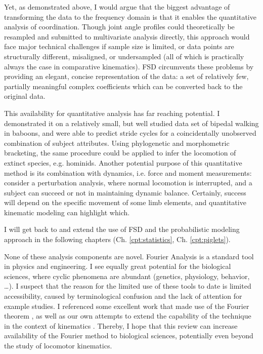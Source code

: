 Yet, as demonstrated above, I would argue that the biggest advantage of transforming the data to the frequency domain is that it enables the quantitative analysis of coordination.
Though joint angle profiles could theoretically be resampled and submitted to multivariate analysis directly, this approach would face major technical challenges if sample size is limited, or data points are structurally different, misaligned, or undersampled (all of which is practically always the case in comparative kinematics).
FSD circumvents these problems by providing an elegant, concise representation of the data: a set of relatively few, partially meaningful complex coefficients which can be converted back to the original data.


This availability for quantitative analysis has far reaching potential.
I demonstrated it on a relatively small, but well studied data set of bipedal walking in baboons, and were able to predict stride cycles for a coincidentally unobserved combination of subject attributes.
Using phylogenetic and morphometric bracketing, the same procedure could be applied to infer the locomotion of extinct species, e.g. hominids.
Another potential purpose of this quantitative method is its combination with dynamics, i.e. force and moment measurements:
consider a perturbation analysis, where normal locomotion is interrupted, and a subject can succeed or not in maintaining dynamic balance.
Certainly, success will depend on the specific movement of some limb elements, and quantitative kinematic modeling can highlight which.

I will get back to and extend the use of FSD and the probabilistic modeling approach in the following chapters (Ch. \ref{cpt:statistics}, Ch. \ref{cpt:piglets}).


None of these analysis components are novel.
Fourier Analysis is a standard tool in physics and engineering.
I see equally great potential for the biological sciences, where cyclic phenomena are abundant (genetics, physiology, behavior, \ldots{}).
I suspect that the reason for the limited use of these tools to date is limited accessibility, caused by terminological confusion and the lack of attention for example studies.
I referenced some excellent work that made use of the Fourier theorem \citep{Bernstein1935,Pike2002,Webb2007}, as well as our own attempts to extend the capability of the technique in the context of kinematics \citep{Mielke2019,Mielke2023}.
Thereby, I hope that this review can increase availability of the Fourier method to biological sciences, potentially even beyond the study of locomotor kinematics.




